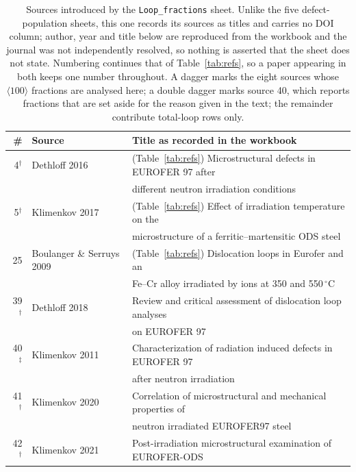 \begin{table}[htbp]
\centering\small
\caption{Sources introduced by the \texttt{Loop\_fractions} sheet. Unlike the five
defect-population sheets, this one records its sources as titles and carries no DOI
column; author, year and title below are reproduced from the workbook and the journal
was not independently resolved, so nothing is asserted that the sheet does not state.
Numbering continues that of Table~\ref{tab:refs}, so a paper appearing in both keeps
one number throughout. A dagger marks the eight sources whose
$\langle 100\rangle$ fractions are analysed here; a double dagger marks source 40,
which reports fractions that are set aside for the reason given in the text; the
remainder contribute total-loop rows only.}
\label{tab:lf-refs}
\begin{tabular}{rll}
\toprule
\# & Source & Title as recorded in the workbook \\
\midrule
 4$^{\dagger}$ & Dethloff 2016   & (Table~\ref{tab:refs}) Microstructural defects in EUROFER 97 after \\
                &                & different neutron irradiation conditions \\
 5$^{\dagger}$ & Klimenkov 2017  & (Table~\ref{tab:refs}) Effect of irradiation temperature on the \\
                &                & microstructure of a ferritic--martensitic ODS steel \\
25              & Boulanger \& Serruys 2009 & (Table~\ref{tab:refs}) Dislocation loops in Eurofer and an \\
                &                & Fe--Cr alloy irradiated by ions at 350 and 550\,$^{\circ}$C \\
39$^{\dagger}$ & Dethloff 2018   & Review and critical assessment of dislocation loop analyses \\
                &                & on EUROFER 97 \\
40$^{\ddagger}$ & Klimenkov 2011  & Characterization of radiation induced defects in EUROFER 97 \\
                &                & after neutron irradiation \\
41$^{\dagger}$ & Klimenkov 2020  & Correlation of microstructural and mechanical properties of \\
                &                & neutron irradiated EUROFER97 steel \\
42$^{\dagger}$ & Klimenkov 2021  & Post-irradiation microstructural examination of EUROFER-ODS \\

\end{tabular}
\end{table}
